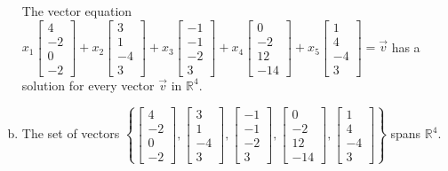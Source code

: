 \begin{exerciseAnswer}
\begin{enumerate}[(a)]
\begin{center}\begin{minipage}{0.8\textwidth}
 The vector equation \( x_{1} \left[\begin{array}{c}
4 \\
-2 \\
0 \\
-2
\end{array}\right] + x_{2} \left[\begin{array}{c}
3 \\
1 \\
-4 \\
3
\end{array}\right] + x_{3} \left[\begin{array}{c}
-1 \\
-1 \\
-2 \\
3
\end{array}\right] + x_{4} \left[\begin{array}{c}
0 \\
-2 \\
12 \\
-14
\end{array}\right] + x_{5} \left[\begin{array}{c}
1 \\
4 \\
-4 \\
3
\end{array}\right] =\vec{v}\) has a solution for every vector \(\vec{v}\) in \(\mathbb{R}^4\). 
\end{minipage}\end{center}
    
\item  The set of vectors \( \left\{ \left[\begin{array}{c}
4 \\
-2 \\
0 \\
-2
\end{array}\right] , \left[\begin{array}{c}
3 \\
1 \\
-4 \\
3
\end{array}\right] , \left[\begin{array}{c}
-1 \\
-1 \\
-2 \\
3
\end{array}\right] , \left[\begin{array}{c}
0 \\
-2 \\
12 \\
-14
\end{array}\right] , \left[\begin{array}{c}
1 \\
4 \\
-4 \\
3
\end{array}\right] \right\} \) spans \(\mathbb{R}^4\). 
\end{enumerate}
    
\end{exerciseAnswer}
    
